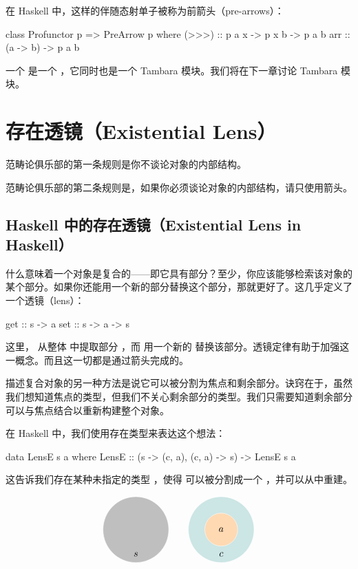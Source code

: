 \documentclass[DaoFP]{subfiles}
\begin{document}
 在 Haskell 中，这样的伴随态射单子被称为前箭头（pre-arrows）：
 \begin{haskell}
  class Profunctor p => PreArrow p where
  (>>>) :: p a x -> p x b -> p a b
  arr   :: (a -> b) -> p a b
 \end{haskell}
 一个  是一个 ，它同时也是一个 Tambara 模块。我们将在下一章讨论 Tambara 模块。

 \section{存在透镜（Existential Lens）}

 范畴论俱乐部的第一条规则是你不谈论对象的内部结构。

 范畴论俱乐部的第二条规则是，如果你必须谈论对象的内部结构，请只使用箭头。

 \subsection{Haskell 中的存在透镜（Existential Lens in Haskell）}

 什么意味着一个对象是复合的——即它具有部分？至少，你应该能够检索该对象的某个部分。如果你还能用一个新的部分替换这个部分，那就更好了。这几乎定义了一个透镜（lens）：
 \begin{haskell}
  get :: s -> a
  set :: s -> a -> s
 \end{haskell}
 这里， 从整体  中提取部分 ，而  用一个新的  替换该部分。透镜定律有助于加强这一概念。而且这一切都是通过箭头完成的。

 描述复合对象的另一种方法是说它可以被分割为焦点和剩余部分。诀窍在于，虽然我们想知道焦点的类型，但我们不关心剩余部分的类型。我们只需要知道剩余部分可以与焦点结合以重新构建整个对象。

 在 Haskell 中，我们使用存在类型来表达这个想法：
 \begin{haskell}
  data LensE s a where
  LensE :: (s -> (c, a), (c, a) -> s) -> LensE s a
 \end{haskell}
 这告诉我们存在某种未指定的类型 ，使得  可以被分割成一个 ，并可以从中重建。

 \[
  \begin{tikzpicture}
   \filldraw[fill=gray!50, draw=white] (0, 0) circle (1.2);
   \node at (0, -0.9) {$s$};
  \end{tikzpicture}
  \hspace{20pt}
  \begin{tikzpicture}
   \filldraw[fill=blue!50!green!20, draw=white] (0, 0) circle (1.2);
   \filldraw[fill=orange!30, draw=white] (0, 0) circle (0.6);
   \node at (0, 0) {$a$};
   \node at (0, -0.9) {$c$};
  \end{tikzpicture}
 \]
\end{document}
